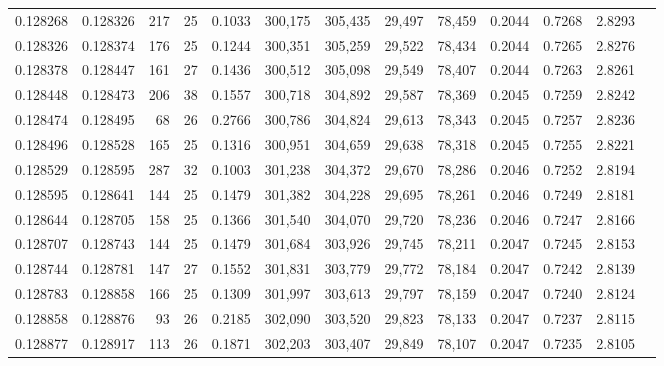 \begin{tabular}{rrrrrrrrrrrrr}
0.128268 & 0.128326 & 217 &  25 &                                     0.1033 & 300,175 & 305,435 &  29,497 &  78,459 & 0.2044 & 0.7268 & 2.8293 \\
0.128326 & 0.128374 & 176 &  25 &                                     0.1244 & 300,351 & 305,259 &  29,522 &  78,434 & 0.2044 & 0.7265 & 2.8276 \\
0.128378 & 0.128447 & 161 &  27 &                                     0.1436 & 300,512 & 305,098 &  29,549 &  78,407 & 0.2044 & 0.7263 & 2.8261 \\
0.128448 & 0.128473 & 206 &  38 &                                     0.1557 & 300,718 & 304,892 &  29,587 &  78,369 & 0.2045 & 0.7259 & 2.8242 \\
0.128474 & 0.128495 &  68 &  26 &                                     0.2766 & 300,786 & 304,824 &  29,613 &  78,343 & 0.2045 & 0.7257 & 2.8236 \\
0.128496 & 0.128528 & 165 &  25 &                                     0.1316 & 300,951 & 304,659 &  29,638 &  78,318 & 0.2045 & 0.7255 & 2.8221 \\
0.128529 & 0.128595 & 287 &  32 &                                     0.1003 & 301,238 & 304,372 &  29,670 &  78,286 & 0.2046 & 0.7252 & 2.8194 \\
0.128595 & 0.128641 & 144 &  25 &                                     0.1479 & 301,382 & 304,228 &  29,695 &  78,261 & 0.2046 & 0.7249 & 2.8181 \\
0.128644 & 0.128705 & 158 &  25 &                                     0.1366 & 301,540 & 304,070 &  29,720 &  78,236 & 0.2046 & 0.7247 & 2.8166 \\
0.128707 & 0.128743 & 144 &  25 &                                     0.1479 & 301,684 & 303,926 &  29,745 &  78,211 & 0.2047 & 0.7245 & 2.8153 \\
0.128744 & 0.128781 & 147 &  27 &                                     0.1552 & 301,831 & 303,779 &  29,772 &  78,184 & 0.2047 & 0.7242 & 2.8139 \\
0.128783 & 0.128858 & 166 &  25 &                                     0.1309 & 301,997 & 303,613 &  29,797 &  78,159 & 0.2047 & 0.7240 & 2.8124 \\
0.128858 & 0.128876 &  93 &  26 &                                     0.2185 & 302,090 & 303,520 &  29,823 &  78,133 & 0.2047 & 0.7237 & 2.8115 \\
0.128877 & 0.128917 & 113 &  26 &                                     0.1871 & 302,203 & 303,407 &  29,849 &  78,107 & 0.2047 & 0.7235 & 2.8105 \\

\end{tabular}
